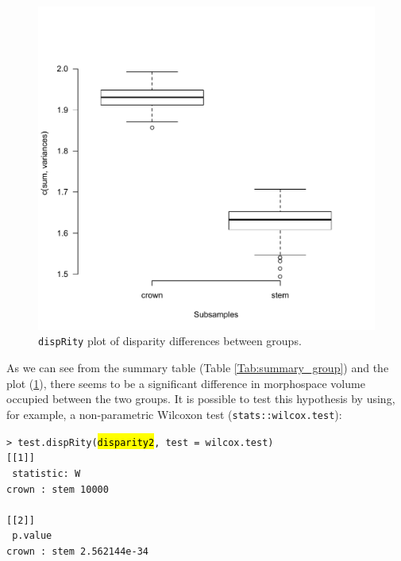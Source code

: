 \documentclass[12pt,letterpaper]{article}
\newcommand{\disp}{\texttt{dispRity} }
\begin{document}
\begin{figure}[!htbp]
\centering
   \includegraphics[width=1\textwidth]{plot_example_group.pdf} 
\caption{\disp plot of disparity differences between groups.}
\label{Fig:plot_group}
\end{figure}

As we can see from the summary table (Table \ref{Tab:summary_group}) and the plot (\ref{Fig:plot_group}), there seems to be a significant difference in morphospace volume occupied between the two groups.
It is possible to test this hypothesis by using, for example, a non-parametric Wilcoxon test (\texttt{stats::wilcox.test}):

\noindent \texttt{> test.dispRity(\hl{disparity2}, test = wilcox.test)}\\

\noindent \texttt{[[1]]}\\
\noindent \texttt{          statistic: W}\\
\noindent \texttt{crown : stem     10000}\\
\noindent \texttt{ }\\
\noindent \texttt{[[2]]}\\
\noindent \texttt{                  p.value}\\
\noindent \texttt{crown : stem 2.562144e-34}\\
\end{document}
